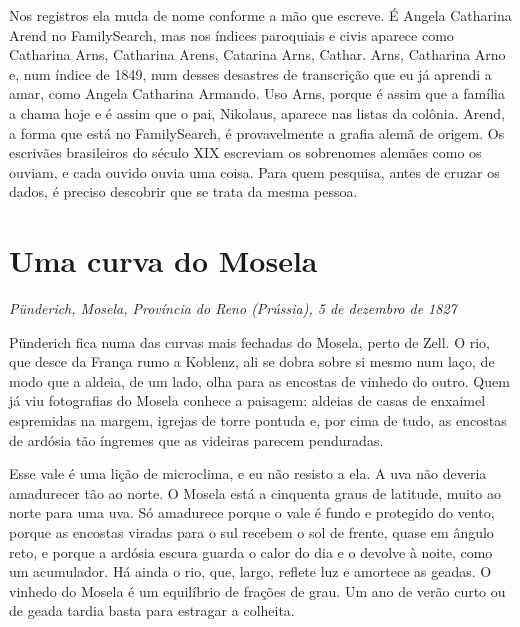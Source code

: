\documentclass[
  brazilian,
  11pt,
  openany]{book}
\begin{document}
Nos registros ela muda de nome conforme a mão que escreve. É Angela
Catharina Arend no FamilySearch, mas nos índices paroquiais e civis
aparece como Catharina Arns, Catharina Arens, Catarina Arns, Cathar.
Arns, Catharina Arno e, num índice de 1849, num desses desastres de
transcrição que eu já aprendi a amar, como Angela Catharina Armando. Uso
Arns, porque é assim que a família a chama hoje e é assim que o pai,
Nikolaus, aparece nas listas da colônia. Arend, a forma que está no
FamilySearch, é provavelmente a grafia alemã de origem. Os escrivães
brasileiros do século XIX escreviam os sobrenomes alemães como os
ouviam, e cada ouvido ouvia uma coisa. Para quem pesquisa, antes de
cruzar os dados, é preciso descobrir que se trata da mesma pessoa.

\section{Uma curva do Mosela}\label{uma-curva-do-mosela}

\emph{Pünderich, Mosela, Província do Reno (Prússia), 5 de dezembro de
1827}

Pünderich fica numa das curvas mais fechadas do Mosela, perto de Zell. O
rio, que desce da França rumo a Koblenz, ali se dobra sobre si mesmo num
laço, de modo que a aldeia, de um lado, olha para as encostas de vinhedo
do outro. Quem já viu fotografias do Mosela conhece a paisagem: aldeias
de casas de enxaimel espremidas na margem, igrejas de torre pontuda e,
por cima de tudo, as encostas de ardósia tão íngremes que as videiras
parecem penduradas.

Esse vale é uma lição de microclima, e eu não resisto a ela. A uva não
deveria amadurecer tão ao norte. O Mosela está a cinquenta graus de
latitude, muito ao norte para uma uva. Só amadurece porque o vale é
fundo e protegido do vento, porque as encostas viradas para o sul
recebem o sol de frente, quase em ângulo reto, e porque a ardósia escura
guarda o calor do dia e o devolve à noite, como um acumulador. Há ainda
o rio, que, largo, reflete luz e amortece as geadas. O vinhedo do Mosela
é um equilíbrio de frações de grau. Um ano de verão curto ou de geada
tardia basta para estragar a colheita.
\end{document}
